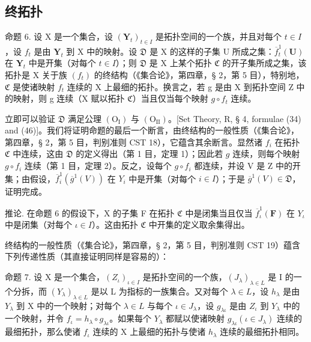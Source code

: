 \subsection{终拓扑}

命题 6. 设 X 是一个集合，设 \((\mathbf{Y}_t)_{t \in I}\) 是拓扑空间的一个族，并且对每个 \(t \in I\)，设 \(f_t\) 是由 \(\mathbf{Y}_t\) 到 X 中的映射。设 \(\mathfrak{D}\) 是 X 的这样的子集 U 所成之集：\(\overline{f}_t^1(\mathbf{U})\) 在 \(\mathbf{Y}_t\) 中是开集（对每个 \(t \in I\)）；则 \(\mathfrak{D}\) 是 X 上某个拓扑 \(\mathfrak{C}\) 的开子集所成之集，该拓扑是 X 关于族 \((f_t)\) 的终结构（《集合论》，第四章，§ 2，第 5 目），特别地，\(\mathfrak{C}\) 是使诸映射 \(f_t\) 连续的 X 上最细的拓扑。换言之，若 g 是由 X 到拓扑空间 Z 中的映射，则 g 连续（X 赋以拓扑 \(\mathfrak{C}\)）当且仅当每个映射 \(g \circ f_t\) 连续。

立即可以验证 \(\mathfrak{D}\) 满足公理 \((\mathrm{O_I})\) 与 \((\mathrm{O_{II}})\)。{[}Set Theory, R, § 4, formulae (34) and (46){]}。我们将证明命题的最后一个断言，由终结构的一般性质（《集合论》，第四章，§ 2，第 5 目，判别准则 CST 18），它蕴含其余断言。显然诸 \(f_{i}\) 在拓扑 \(\mathfrak{C}\) 中连续，这由 \(\mathfrak{D}\) 的定义得出（第 1 目，定理 1）；因此若 \(g\) 连续，则每个映射 \(g \circ f_{i}\) 连续（第 1 目，定理 2）。反之，设每个 \(g \circ f_{i}\) 都连续，并设 V 是 Z 中的开集；由假设，\(\overline{f}_{i}^{1}(\overline{g}^{1}(V))\) 在 \(Y_{i}\) 中是开集（对每个 \(i \in I\)）；于是 \(\overline{g}^{1}(V) \in \mathfrak{D}\)，证明完成。

推论. 在命题 6 的假设下，X 的子集 F 在拓扑 \(\mathfrak{C}\) 中是闭集当且仅当 \(\overline{f}_{\iota}^{1}(\mathbf{F})\) 在 \(Y_{\iota}\) 中是闭集（对每个 \(\iota \in I\)）。这由拓扑 \(\mathfrak{C}\) 中开集的定义取余集得出。

终结构的一般性质（《集合论》，第四章，§ 2，第 5 目，判别准则 CST 19）蕴含下列传递性质（其直接证明同样是容易的）：

命题 7. 设 X 是一个集合，\((Z_{\iota})_{\iota \in I}\) 是拓扑空间的一个族，\((J_{\lambda})_{\lambda \in L}\) 是 I 的一个分拆，而 \((Y_{\lambda})_{\lambda \in L}\) 是以 L 为指标的一族集合。又对每个 \(\lambda \in L\)，设 \(h_{\lambda}\) 是由 \(Y_{\lambda}\) 到 X 中的一个映射；对每个 \(\lambda \in L\) 与每个 \(\iota \in J_{\lambda}\)，设 \(g_{\lambda \iota}\) 是由 \(Z_{\iota}\) 到 \(Y_{\lambda}\) 中的一个映射，并令 \(f_{\iota} = h_{\lambda} \circ g_{\lambda \iota}\)。如果每个 \(Y_{\lambda}\) 都赋以使诸映射 \(g_{\lambda \iota} (\iota \in J_{\lambda})\) 连续的最细拓扑，那么使诸 \(f_{\iota}\) 连续的 X 上最细的拓扑与使诸 \(h_{\lambda}\) 连续的最细拓扑相同。

